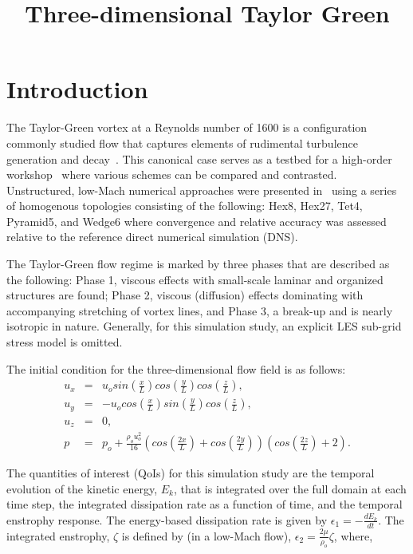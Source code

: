 \documentclass{article}
\title{Three-dimensional Taylor Green}
\date{}
\begin{document}
\maketitle

\section{Introduction}
The Taylor-Green vortex at a Reynolds number of 1600 is a configuration 
commonly studied flow that captures elements of rudimental turbulence generation and 
decay~\cite{taylorGreen}. This canonical case serves as a testbed for a high-order workshop~\cite{hillewaert2012}
where various schemes can be compared and contrasted. 
Unstructured, low-Mach numerical approaches were presented in~\cite{domino2019} using a series of 
homogenous topologies consisting of the following: Hex8, Hex27, Tet4, Pyramid5, and Wedge6 where
convergence and relative accuracy was assessed relative to the reference direct numerical simulation (DNS).

The Taylor-Green flow regime is marked by three phases that are described as the following: Phase 1, viscous effects 
with small-scale laminar and organized structures are found; Phase 2, viscous (diffusion) effects 
dominating with accompanying stretching of vortex lines, and Phase 3, a break-up and is nearly 
isotropic in nature. Generally, for this simulation study, an explicit LES sub-grid stress model 
is omitted.  

The initial condition for the three-dimensional flow field is as follows:
%
\begin{eqnarray}
u_x &=& u_o sin(\frac{x}{L})cos(\frac{y}{L})cos(\frac{z}{L}), \nonumber \\
u_y &=& -u_o cos(\frac{x}{L})sin(\frac{y}{L})cos(\frac{z}{L}), \nonumber \\
u_z &=& 0, \nonumber \\
p &=& p_o + \frac{\rho_o u_o^2}{16}\left(cos(\frac{2x}{L}) + cos(\frac{2y}{L})\right)\left(cos(\frac{2z}{L})+2\right).
\end{eqnarray}

The quantities of interest (QoIs) for this simulation study are the temporal evolution of the kinetic energy, $E_k$, that
is integrated over the full domain at each time step, the integrated dissipation rate as a function of time, and the temporal enstrophy
response. The energy-based dissipation rate is given by $\epsilon_1 = -\frac{dE_k}{dt}$. 
The integrated enstrophy, $\zeta$ is defined by (in a low-Mach flow), $\epsilon_2 = \frac{2 \mu}{\rho_o} \zeta$,
where,
\end{document}
